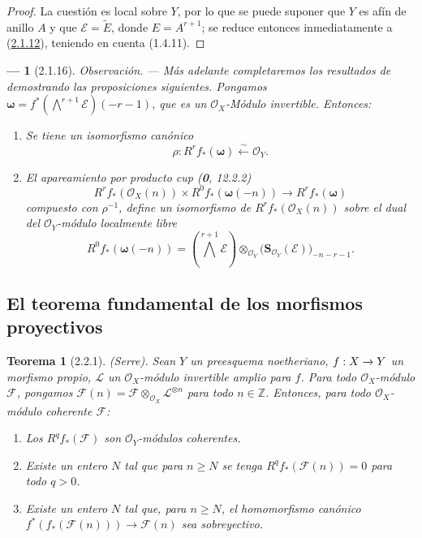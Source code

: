 \documentclass[10pt,oneside,openany]{book}
\theoremstyle{egaenv}\newtheorem*{env}{---}
\theoremstyle{egastatement}
\newtheorem*{theorem}{Teorema}
\theoremstyle{egadescription}
\newcommand{\oldpage}[2][]{\marginnote{\normalfont\scriptsize\textbf{#1}\,|\,#2}\ignorespaces}
\renewcommand{\geq}{\geqslant}
\renewcommand{\to}{\mathchoice{\longrightarrow}{\rightarrow}{\rightarrow}{\rightarrow}}
\begin{document}
\begin{proof}
La cuestión es local sobre $Y$, por lo que se puede suponer que $Y$ es afín de anillo $A$ y que $\mathcal E=\widetilde E$, donde $E=A^{r+1}$; se reduce entonces inmediatamente a (\hyperref[III.2.1.12-fr]{2.1.12}), teniendo en cuenta (1.4.11).
\end{proof}

\begin{env}[2.1.16]
\label{III.2.1.16}
\label{III.2.1.16-fr}
\emph{Observación.} ---
Más adelante completaremos los resultados de  demostrando las proposiciones siguientes.
Pongamos
$\boldsymbol\omega=f^*(\bigwedge^{r+1}\mathcal E)(-r-1)$,
que es un $\mathcal O_X$-Módulo invertible. Entonces:
\begin{enumerate}
\item[{\rm(i)}] Se tiene un isomorfismo canónico
\begin{equation}
\label{III.2.1.16.1-fr}
\tag{2.1.16.1}
\rho:R^rf_*(\boldsymbol\omega)\xleftarrow{\sim}\mathcal O_Y.
\end{equation}
\item[{\rm(ii)}] El apareamiento por producto cup (\textbf{0}, 12.2.2)
\begin{equation}
\label{III.2.1.16.2-fr}
\tag{2.1.16.2}
R^rf_*(\mathcal O_X(n))\times R^0f_*(\boldsymbol\omega(-n))
\longrightarrow R^rf_*(\boldsymbol\omega)
\end{equation}
  compuesto con $\rho^{-1}$, define un \emph{isomorfismo} de $R^rf_*(\mathcal O_X(n))$ sobre el \emph{dual} del $\mathcal O_Y$-módulo localmente libre
  \[
R^0f_*(\boldsymbol\omega(-n))
=\left(\bigwedge^{r+1}\mathcal E\right)
\otimes_{\mathcal O_Y}\bigl(\mathbf S_{\mathcal O_Y}(\mathcal E)\bigr)_{-n-r-1}.
\]
\end{enumerate}
\end{env}

\subsection{El teorema fundamental de los morfismos proyectivos}
\label{subsection:III.2.2}
\label{subsection:III.2.2-fr}
\oldpage[III]{100}

\begin{theorem}[2.2.1]
\label{III.2.2.1-fr}
(Serre). Sean $Y$ un preesquema noetheriano, $f:X\to Y$ un morfismo propio, $\mathcal L$ un $\mathcal O_X$-módulo invertible amplio para $f$. Para todo $\mathcal O_X$-módulo $\mathcal F$, pongamos
$\mathcal F(n)=\mathcal F\otimes_{\mathcal O_X}\mathcal L^{\otimes n}$
para todo $n\in\mathbb Z$. Entonces, para todo $\mathcal O_X$-módulo coherente $\mathcal F$:
\begin{enumerate}
\item[{\rm(i)}] Los $R^qf_*(\mathcal F)$ son $\mathcal O_Y$-módulos coherentes.
\item[{\rm(ii)}] Existe un entero $N$ tal que para $n\geq N$ se tenga $R^qf_*(\mathcal F(n))=0$ para todo $q>0$.
\item[{\rm(iii)}] Existe un entero $N$ tal que, para $n\geq N$, el homomorfismo canónico
$f^*(f_*(\mathcal F(n)))\longrightarrow\mathcal F(n)$
sea sobreyectivo.
\end{enumerate}
\end{theorem}
\end{document}

